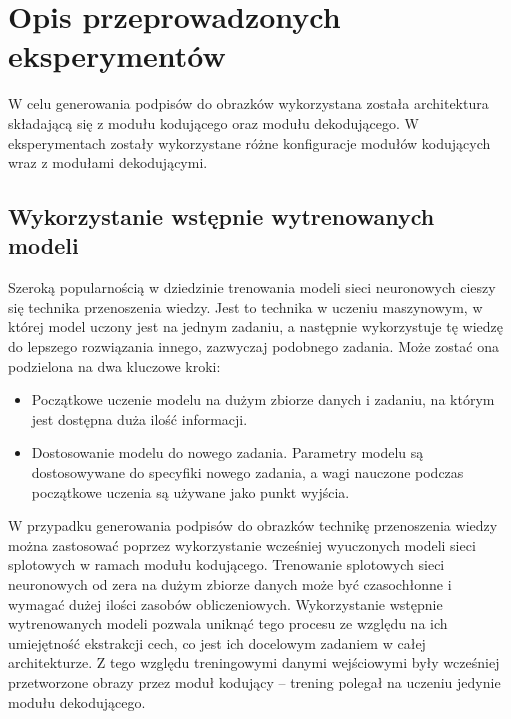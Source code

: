 \newpage %

\section{Opis przeprowadzonych eksperymentów}
W celu generowania podpisów do obrazków wykorzystana została architektura składającą się z modułu kodującego oraz modułu dekodującego. W eksperymentach zostały wykorzystane różne konfiguracje modułów kodujących wraz z modułami dekodującymi.
\subsection{Wykorzystanie wstępnie wytrenowanych modeli}
Szeroką popularnością w dziedzinie trenowania modeli sieci neuronowych cieszy się technika przenoszenia wiedzy. Jest to technika w uczeniu maszynowym, w której model uczony jest na jednym zadaniu, a następnie wykorzystuje tę wiedzę do lepszego rozwiązania innego, zazwyczaj podobnego zadania. Może zostać ona podzielona na dwa kluczowe kroki:
\begin{itemize}
    \item Początkowe uczenie modelu na dużym zbiorze danych i zadaniu, na którym jest dostępna duża ilość informacji.
    \item  Dostosowanie modelu do nowego zadania. Parametry modelu są dostosowywane do specyfiki nowego zadania, a wagi nauczone podczas początkowe uczenia są używane jako punkt wyjścia.
\end{itemize}
W przypadku generowania podpisów do obrazków technikę przenoszenia wiedzy można zastosować poprzez wykorzystanie wcześniej wyuczonych modeli sieci splotowych w ramach modułu kodującego. Trenowanie splotowych sieci neuronowych od zera na dużym zbiorze danych może być czasochłonne i wymagać dużej ilości zasobów obliczeniowych. Wykorzystanie wstępnie wytrenowanych modeli pozwala uniknąć tego procesu ze względu na ich umiejętność ekstrakcji cech, co jest ich docelowym zadaniem w całej architekturze. Z tego względu treningowymi danymi wejściowymi były wcześniej przetworzone obrazy przez moduł kodujący -- trening polegał na uczeniu jedynie modułu dekodującego.

